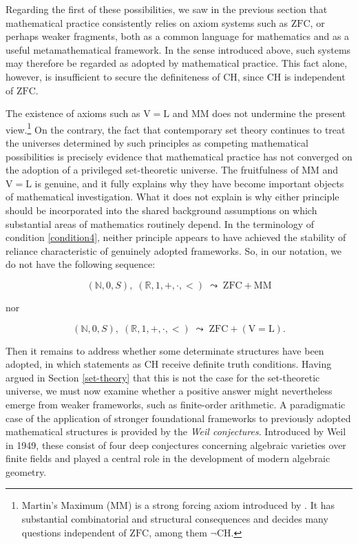 \documentclass[11pt,a4paper]{article}
\begin{document}
Regarding the first of these possibilities, we saw in the previous section that mathematical practice consistently relies on axiom systems such as $\mathrm{ZFC}$, or perhaps weaker fragments, both as a common language for mathematics and as a useful metamathematical framework. In the sense introduced above, such systems may therefore be regarded as adopted by mathematical practice. This fact alone, however, is insufficient to secure the definiteness of $\mathrm{CH}$, since $\mathrm{CH}$ is independent of $\mathrm{ZFC}$.

The existence of axioms such as $\mathrm{V=L}$ and $\mathrm{MM}$ does not undermine the present view.\footnote{Martin's Maximum (MM) is a strong forcing axiom introduced by \textcite{ForemanMagidorShelah1988}. It has substantial combinatorial and structural consequences and decides many questions independent of $\mathrm{ZFC}$, among them $\neg\mathrm{CH}$.} On the contrary, the fact that contemporary set theory continues to treat the universes determined by such principles as competing mathematical possibilities is precisely evidence that mathematical practice has not converged on the adoption of a privileged set-theoretic universe. The fruitfulness of $\mathrm{MM}$ and $\mathrm{V=L}$ is genuine, and it fully explains why they have become important objects of mathematical investigation. What it does not explain is why either principle should be incorporated into the shared background assumptions on which substantial areas of mathematics routinely depend. In the terminology of condition \ref{condition4}, neither principle appears to have achieved the stability of reliance characteristic of genuinely adopted frameworks. So, in our notation, we do not have the following sequence:

$$ (\mathbb{N}, 0, S), \; (\mathbb{R},1, +, \cdot, <) \; \leadsto \; \mathrm{ZFC}+\mathrm{MM} $$

nor 

$$ (\mathbb{N}, 0, S), \; (\mathbb{R},1, +, \cdot, <) \; \leadsto \; \mathrm{ZFC}+\mathrm{(V=L)}. $$

Then it remains to address whether some determinate structures have been adopted, in which statements as $\mathrm{CH}$ receive definite truth conditions. Having argued in Section \ref{set-theory} that this is not the case for the set-theoretic universe, we must now examine whether a positive answer might nevertheless emerge from weaker frameworks, such as finite-order arithmetic.
A paradigmatic case of the application of stronger foundational frameworks to previously adopted mathematical structures is provided by the \textit{Weil conjectures}. Introduced by Weil in 1949, these consist of four deep conjectures concerning algebraic varieties over finite fields and played a central role in the development of modern algebraic geometry.
\end{document}
